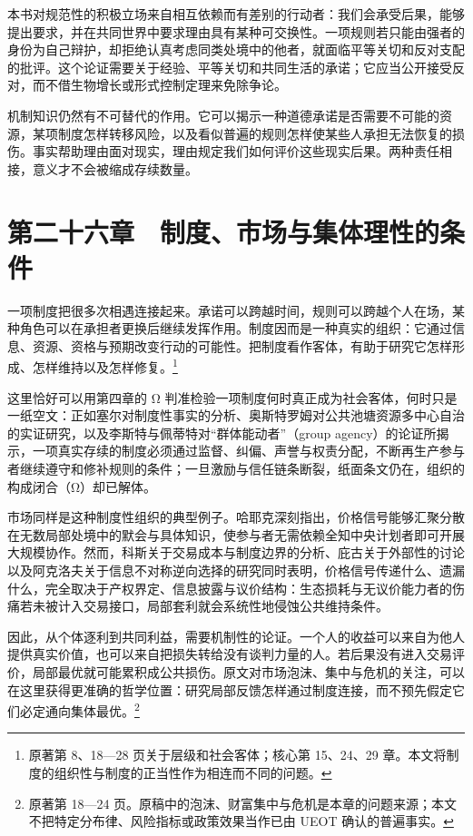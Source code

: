 \documentclass[
  11pt,
  oneside]{book}
\begin{document}
本书对规范性的积极立场来自相互依赖而有差别的行动者：我们会承受后果，能够提出要求，并在共同世界中要求理由具有某种可交换性。一项规则若只能由强者的身份为自己辩护，却拒绝认真考虑同类处境中的他者，就面临平等关切和反对支配的批评。这个论证需要关于经验、平等关切和共同生活的承诺；它应当公开接受反对，而不借生物增长或形式控制定理来免除争论。

\begingroup{}

机制知识仍然有不可替代的作用。它可以揭示一种道德承诺是否需要不可能的资源，某项制度怎样转移风险，以及看似普遍的规则怎样使某些人承担无法恢复的损伤。事实帮助理由面对现实，理由规定我们如何评价这些现实后果。两种责任相接，意义才不会被缩成存续数量。

\par\endgroup

\chapter{第二十六章　制度、市场与集体理性的条件}\label{ph-ch-26}

一项制度把很多次相遇连接起来。承诺可以跨越时间，规则可以跨越个人在场，某种角色可以在承担者更换后继续发挥作用。制度因而是一种真实的组织：它通过信息、资源、资格与预期改变行动的可能性。把制度看作客体，有助于研究它怎样形成、怎样维持以及怎样修复。\footnote{\hypertarget{ph-note-60}{}原著第 8、18---28 页关于层级和社会客体；核心第 15、24、29 章。本文将制度的组织性与制度的正当性作为相连而不同的问题。}

这里恰好可以用第四章的 Ω 判准检验一项制度何时真正成为社会客体，何时只是一纸空文：正如塞尔对制度性事实的分析、奥斯特罗姆对公共池塘资源多中心自治的实证研究，以及李斯特与佩蒂特对``群体能动者''（group agency）的论证所揭示，一项真实存续的制度必须通过监督、纠偏、声誉与权责分配，不断再生产参与者继续遵守和修补规则的条件；一旦激励与信任链条断裂，纸面条文仍在，组织的构成闭合（Ω）却已解体。

市场同样是这种制度性组织的典型例子。哈耶克深刻指出，价格信号能够汇聚分散在无数局部处境中的默会与具体知识，使参与者无需依赖全知中央计划者即可开展大规模协作。然而，科斯关于交易成本与制度边界的分析、庇古关于外部性的讨论以及阿克洛夫关于信息不对称逆向选择的研究同时表明，价格信号传递什么、遗漏什么，完全取决于产权界定、信息披露与议价结构：生态损耗与无议价能力者的伤痛若未被计入交易接口，局部套利就会系统性地侵蚀公共维持条件。

因此，从个体逐利到共同利益，需要机制性的论证。一个人的收益可以来自为他人提供真实价值，也可以来自把损失转给没有谈判力量的人。若后果没有进入交易评价，局部最优就可能累积成公共损伤。原文对市场泡沫、集中与危机的关注，可以在这里获得更准确的哲学位置：研究局部反馈怎样通过制度连接，而不预先假定它们必定通向集体最优。\footnote{\hypertarget{ph-note-61}{}原著第 18---24 页。原稿中的泡沫、财富集中与危机是本章的问题来源；本文不把特定分布律、风险指标或政策效果当作已由 UEOT 确认的普遍事实。}
\end{document}
